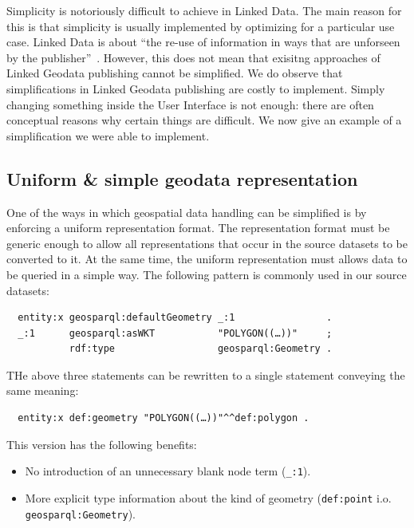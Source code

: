 \documentclass[a4paper]{scrartcl}
\newcommand{\textt}[1]{{\small \texttt{#1}}}
\begin{document}
Simplicity is notoriously difficult to achieve in Linked Data.  The
main reason for this is that simplicity is usually implemented by
optimizing for a particular use case.  Linked Data is about ``the
re-use of information in ways that are unforseen by the
publisher''~\cite{Bernerslee2006}.  However, this does not mean that
exisitng approaches of Linked Geodata publishing cannot be simplified.
We do observe that simplifications in Linked Geodata publishing are
costly to implement.  Simply changing something inside the User
Interface is not enough: there are often conceptual reasons why
certain things are difficult.  We now give an example of a
simplification we were able to implement.


\subsection{Uniform \& simple geodata representation}

One of the ways in which geospatial data handling can be simplified is
by enforcing a uniform representation format.  The representation
format must be generic enough to allow all representations that occur
in the source datasets to be converted to it.  At the same time, the
uniform representation must allows data to be queried in a simple way.
The following pattern is commonly used in our source datasets:

\begin{verbatim}
  entity:x geosparql:defaultGeometry _:1                .
  _:1      geosparql:asWKT           "POLYGON((…))"     ;
           rdf:type                  geosparql:Geometry .
\end{verbatim}

THe above three statements can be rewritten to a single statement
conveying the same meaning:

\begin{verbatim}
  entity:x def:geometry "POLYGON((…))"^^def:polygon .
\end{verbatim}

This version has the following benefits:

\begin{itemize}

\item No introduction of an unnecessary blank node term (\textt{\_:1}).

\item More explicit type information about the kind of geometry
  (\textt{def:point} i.o. \textt{geosparql:Geometry}).

\end{itemize}
\end{document}
